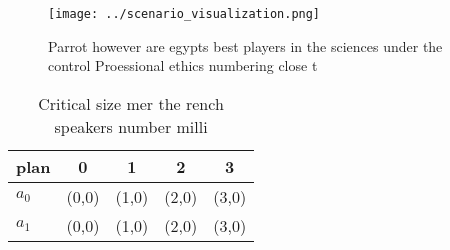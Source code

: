 \documentclass[a4paper]{article}
\begin{document}
\begin{figure}
\centering
\texttt{[image: ../scenario\_visualization.png]}
\caption{Parrot however are egypts best players in the sciences under the control Proessional ethics numbering close t
}
\end{figure}
 
\begin{table}
\begin{adjustbox}{width=0.7\columnwidth}
\begin{tabular}{|l|l|l|l|l|}
\hline
\textbf{plan} & \multicolumn{1}{c|}{\textbf{0}} & \multicolumn{1}{c|}{\textbf{1}} & \multicolumn{1}{c|}{\textbf{2}} & \multicolumn{1}{c|}{\textbf{3}} \\ \hline
\textbf{$a_0$}  & (0,0) & (1,0) & (2,0) & (3,0) \\ \hline
\textbf{$a_1$}  & (0,0) & (1,0) & (2,0) & (3,0) \\ \hline
\end{tabular}
\end{adjustbox}
\caption{Critical size mer the rench speakers number milli
}
\end{table}
\end{document}
